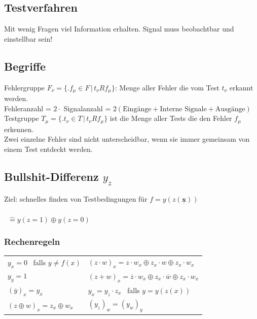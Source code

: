 \documentclass[6pt,a4paper]{scrartcl}
\renewcommand{\vec}[1]{\ensuremath{\underline{\boldsymbol {#1}}}}
\newcommand{\iset}[2]{\ensuremath{\bigl\{ \bigl. #1 \, \bigr| \, #2 \bigr\}}}		%
\renewcommand{\vec}[1]{\ensuremath{\underline{\boldsymbol {#1}}}}
\begin{document}
\begin{multicols}{3}
\section{Testverfahren}
Mit wenig Fragen viel Information erhalten. Signal muss beobachtbar und einstellbar sein!\\

	\subsection{Begriffe}
	Fehlergruppe $F_\nu = \iset{f_\mu \in F}{t_\nu R f_\mu}$: Menge aller Fehler die vom Test $t_\nu$ erkannt werden.\\
	Fehleranzahl = $2 \cdot$ Signalanzahl = $2 (\text{Eingänge} + \text{Interne Signale} + \text{Ausgänge})$\\
	Testgruppe $T_\mu = \iset{t_\nu \in T}{t_\nu R f_\mu}$ ist die Menge aller Tests die den Fehler $f_\mu$ erkennen.\\

	Zwei einzelne Fehler sind nicht unterscheidbar, wenn sie immer gemeinsam von einem Test entdeckt werden.\\ 

	\subsection{Bullshit-Differenz $y_z$}
	Ziel: schnelles finden von Testbedingungen für $f = y(z(\vec x))$\\
	\\
	\boxed{ y_z = y(z,\vec x) \oplus y(\overline z, \vec x) } \ $\mathrel{\widehat{=}} y(z = 1) \oplus y(z=0)$\\
	
	\subsubsection{Rechenregeln}
	\begin{tabular}{ll}
		$y_x = 0$ \ falls $y \ne f(x)$ & $(z \cdot w)_x = z \cdot w_x \oplus z_x \cdot w \oplus z_x \cdot w_x$\\ 
		$y_y =1$ & $(z + w)_x = \overline z \cdot w_x \oplus z_x \cdot \overline w \oplus z_x \cdot w_x$\\
		$(\overline y)_x = y_x$ & $y_x = y_z \cdot z_x$ \ falls $y = y(z(x))$\\
		$(z \oplus w)_x = z_x \oplus w_x$ & $(y_z)_w = (y_w)_y$\\
	\end{tabular}

\end{multicols}
\end{document}
